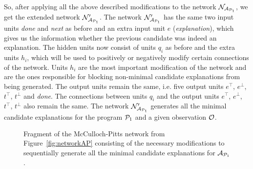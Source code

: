 So, after applying all the above described modifications to the network $\mathcal{N}_{\mathcal{A}_{\mathcal{P}_1}}$, we get the extended network $\mathcal{N}'_{\mathcal{A}_{\mathcal{P}_1}}$. The network $\mathcal{N}'_{\mathcal{A}_{\mathcal{P}_1}}$ has the same two input units \textit{done} and \textit{next} as before and an extra input unit $e$ (\textit{explanation}), which gives us the information whether the previous candidate was indeed an explanation. The hidden units now consist of units $q_i$ as before and the extra units $h_i$, which will be used to positively or negatively modify certain connections of the network. Units $h_i$ are the most important modification of the network and are the ones responsible for blocking non-minimal candidate explanations from being generated. The output units remain the same, i.e. five output units $e^\top$, $e^\bot$, $t^\top$, $t^\bot$ and \textit{done}. The connections between units $q_i$ and the output units $e^\top$, $e^\bot$, $t^\top$, $t^\bot$ also remain the same. The network $\mathcal{N}'_{\mathcal{A}_{\mathcal{P}_1}}$ generates all the minimal candidate explanations for the program $\mathcal{P}_1$ and a given observation $\mathcal{O}$.

\begin{figure}
\centering
\scalebox{0.5}{\NetworkAPExtension}
\caption{Fragment of the McCulloch-Pitts network from Figure~\ref{fig:networkAP} consisting of the necessary modifications to sequentially generate all the minimal candidate explanations for $\mathcal{A}_{\mathcal{P}_1}$.}
\label{fig:networkAPExtension}
\end{figure}


